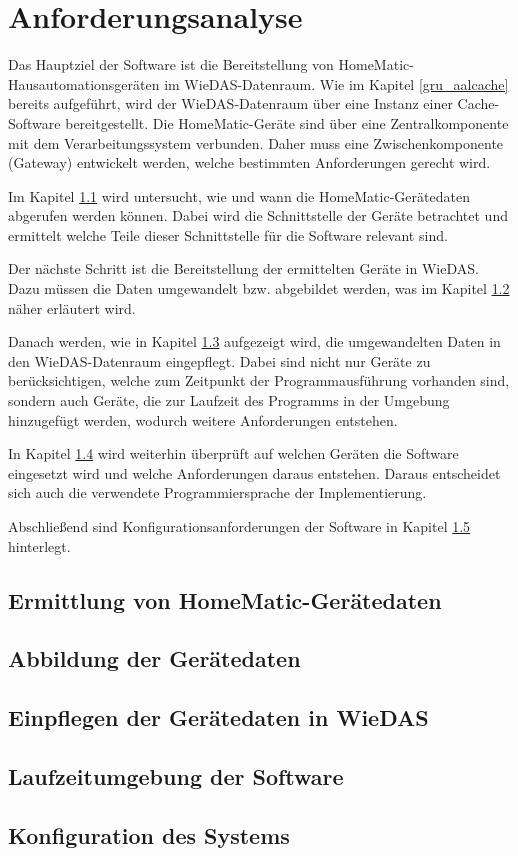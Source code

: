 \chapter{Anforderungsanalyse}

Das Hauptziel der Software ist die Bereitstellung von HomeMatic-Hausautomationsgeräten
im WieDAS-Datenraum.
Wie im Kapitel \ref{gru_aalcache} bereits aufgeführt, wird der WieDAS-Datenraum über eine Instanz
einer Cache-Software bereitgestellt.
Die HomeMatic-Geräte sind über eine Zentralkomponente mit dem Verarbeitungssystem verbunden.
Daher muss eine Zwischenkomponente (Gateway) entwickelt werden, welche bestimmten Anforderungen
gerecht wird.

Im Kapitel \ref{ana_ermittlung} wird untersucht, wie und wann die HomeMatic-Gerätedaten
abgerufen werden können.
Dabei wird die Schnittstelle der Geräte betrachtet und ermittelt welche Teile dieser Schnittstelle
für die Software relevant sind.

Der nächste Schritt ist die Bereitstellung der ermittelten Geräte in WieDAS.
Dazu müssen die Daten umgewandelt bzw. abgebildet werden, was im Kapitel \ref{ana_abb} näher erläutert wird.

Danach werden, wie in Kapitel \ref{ana_einpflegen} aufgezeigt wird, die umgewandelten Daten in den
WieDAS-Datenraum eingepflegt.
Dabei sind nicht nur Geräte zu berücksichtigen, welche zum Zeitpunkt der Programmausführung vorhanden sind,
sondern auch Geräte, die zur Laufzeit des Programms in der Umgebung hinzugefügt werden, wodurch weitere
Anforderungen entstehen.

In Kapitel \ref{ana_laufzeitumgebung} wird weiterhin überprüft auf welchen Geräten die Software eingesetzt wird
und welche Anforderungen daraus entstehen.
Daraus entscheidet sich auch die verwendete Programmiersprache der Implementierung.

Abschließend sind Konfigurationsanforderungen der Software in Kapitel \ref{ana_konfiguration} hinterlegt.

\section{Ermittlung von HomeMatic-Gerätedaten}
\label{ana_ermittlung}

\section{Abbildung der Gerätedaten}
\label{ana_abb}

\section{Einpflegen der Gerätedaten in WieDAS}
\label{ana_einpflegen}

\section{Laufzeitumgebung der Software}
\label{ana_laufzeitumgebung}

\section{Konfiguration des Systems}
\label{ana_konfiguration}
